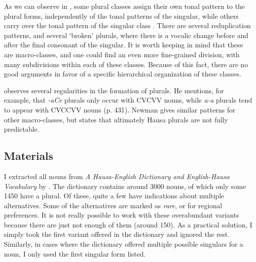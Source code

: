 As we can observe in , some plural classes assign their own tonal pattern to the plural forms, independently of the tonal patterns of the singular, while others carry over the tonal pattern of the singular class \autocite[430]{Newman.2000}. There are several reduplication patterns, and several `broken' plurals, where there is a vocalic change before and after the final consonant of the singular. It is worth keeping in mind that these are macro-classes, and one could find an even more fine-grained division, with many subdivisions within each of these classes. Because of this fact, there are no good arguments in favor of a specific hierarchical organization of these classes.

\textcite[chapter 56]{Newman.2000} observes several regularities in the formation of plurals. He mentions, for example, that \textit{-aCe} plurals only occur with CVCVV nouns, while \textit{a-a} plurals tend to appear with CVCCVV nouns (p. 431). Newman gives similar patterns for other macro-classes, but states that ultimately Hausa plurals are not fully predictable.

\subsection{Materials}

I extracted all nouns from \textit{A Hausa-English Dictionary and English-Hausa Vocabulary} by \textcite{Bargery.1951}. The dictionary contains around 3000 nouns, of which only some 1450 have a plural. Of these, quite a few have indications about multiple alternatives. Some of the alternatives are marked as \textit{rare}, or for regional preferences. It is not really possible to work with these overabundant variants \autocites{Migeod.1914, Salim.1981, Newman.2000} because there are just not enough of them (around 150). As a practical solution, I simply took the first variant offered in the dictionary and ignored the rest.
Similarly, in cases where the dictionary offered multiple possible singulars for a noun, I only used the first singular form listed.

